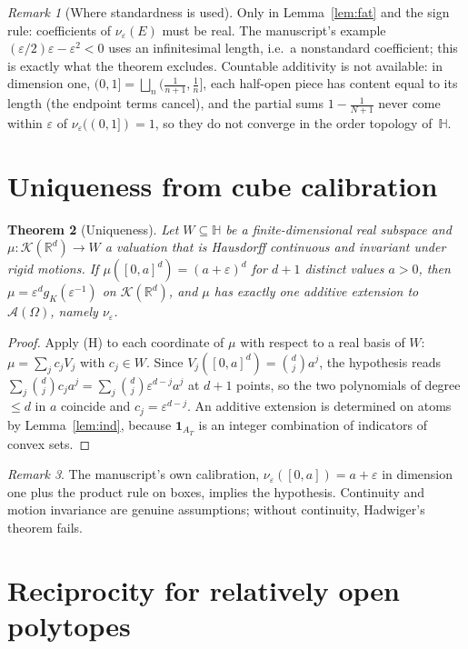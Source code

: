 \documentclass[11pt]{article}
\newtheorem{theorem}{Theorem}[section]
\theoremstyle{definition}
\theoremstyle{remark}
\newtheorem{remark}[theorem]{Remark}
\newcommand{\R}{\mathbb R}
\newcommand{\eps}{\varepsilon}
\newcommand{\HH}{\mathbb H}
\newcommand{\KK}{\mathcal K}
\newcommand{\A}{\mathcal A}
\newcommand{\nuE}{\nu_{\eps}}
\begin{document}
\begin{remark}[Where standardness is used]
Only in Lemma~\ref{lem:fat} and the sign rule: coefficients of
$\nuE(E)$ must be real. The manuscript's example $(\eps/2)\eps-\eps^2<0$
uses an infinitesimal length, i.e.\ a nonstandard coefficient; this is
exactly what the theorem excludes. Countable additivity is not available:
in dimension one, $(0,1]=\bigsqcup_n(\frac1{n+1},\frac1n]$, each half-open
piece has content equal to its length (the endpoint terms cancel), and the
partial sums $1-\frac1{N+1}$ never come within $\eps$ of
$\nu_\eps((0,1])=1$, so they do not converge in the order topology
of~$\HH$.
\end{remark}

\section{Uniqueness from cube calibration}

\begin{theorem}[Uniqueness]\label{thm:unique}
Let $W\subseteq\HH$ be a finite-dimensional real subspace and
$\mu:\KK(\R^d)\to W$ a valuation that is Hausdorff continuous and
invariant under rigid motions. If $\mu([0,a]^d)=(a+\eps)^d$ for $d+1$
distinct values $a>0$, then $\mu=\eps^dg_K(\eps^{-1})$ on $\KK(\R^d)$,
and $\mu$ has exactly one additive extension to $\A(\Omega)$, namely
$\nuE$.
\end{theorem}
\begin{proof}
Apply (H) to each coordinate of $\mu$ with respect to a real basis of
$W$: $\mu=\sum_jc_jV_j$ with $c_j\in W$. Since
$V_j([0,a]^d)=\binom dja^j$, the hypothesis reads
$\sum_j\binom djc_ja^j=\sum_j\binom dj\eps^{d-j}a^j$ at $d+1$ points, so
the two polynomials of degree $\leq d$ in $a$ coincide and
$c_j=\eps^{d-j}$. An additive extension is determined on atoms by
Lemma~\ref{lem:ind}, because $\mathbf 1_{A_T}$ is an integer combination
of indicators of convex sets.
\end{proof}

\begin{remark}
The manuscript's own calibration, $\nuE([0,a])=a+\eps$ in dimension one
plus the product rule on boxes, implies the hypothesis. Continuity and
motion invariance are genuine assumptions; without continuity, Hadwiger's
theorem fails.
\end{remark}

\section{Reciprocity for relatively open polytopes}
\end{document}

